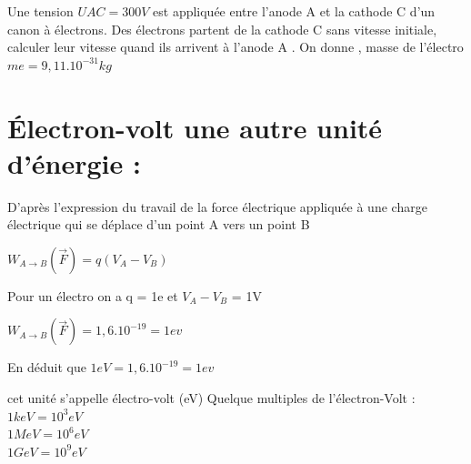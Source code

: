 \documentclass[12pt]{article}
\begin{document}
\begin{tcolorbox}[colback=pink!10!white,
                  colframe=blue!15!gray,
                  title=Application -3- :
                 ]
                 Une tension $UAC = 300V$ est appliquée entre l’anode A et la
cathode C d’un canon à électrons.
Des électrons partent de la cathode C sans vitesse initiale, calculer
leur vitesse quand ils arrivent à l’anode A .
  On donne , masse de l’électro $me = 9, 11.10^{-31}kg$
  \end{tcolorbox}

\section{Électron-volt une autre unité d’énergie : }
D’après l’expression du travail de la force électrique appliquée à
une charge électrique qui se déplace d’un point A vers un point B

$W_{A\rightarrow B}(\vec{F})  = q(V_A - V_B) $

Pour un électro on a q = 1e et $V_A - V_B$ = 1V


$W_{A\rightarrow B}(\vec{F})  = 1,6.10^{-19}= 1ev $

En déduit que $1eV =1,6.10^{-19}= 1ev $

cet unité s’appelle électro-volt (eV)
Quelque multiples de l’électron-Volt :
\\$1keV = 10^3 eV$
\\$1MeV = 10^6 eV$
\\$1GeV = 10^9 eV$
\end{document}
